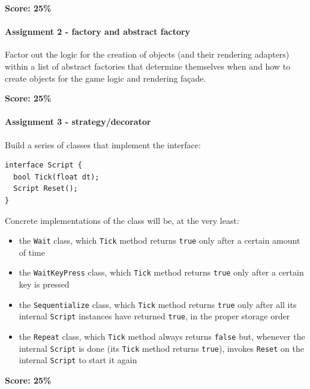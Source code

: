 \documentclass[titlepage,a4paper, 11pt]{article}
\begin{document}
\textbf{Score: 25\%}


\paragraph*{Assignment 2 - factory and abstract factory}
Factor out the logic for the creation of objects (and their rendering adapters) within a list of abstract factories that determine themselves when and how to create objects for the game logic and rendering façade.

\textbf{Score: 25\%}


\paragraph*{Assignment 3 - strategy/decorator}
Build a series of classes that implement the interface:

\begin{lstlisting}
interface Script {
  bool Tick(float dt);
  Script Reset();
}
\end{lstlisting}

Concrete implementations of the class will be, at the very least:
\begin{itemize}
\item the \texttt{Wait} class, which \texttt{Tick} method returns \texttt{true} only after a certain amount of time
\item the \texttt{WaitKeyPress} class, which \texttt{Tick} method returns \texttt{true} only after a certain key is pressed
\item the \texttt{Sequentialize} class, which \texttt{Tick} method returns \texttt{true} only after all its internal \texttt{Script} instances have returned \texttt{true}, in the proper storage order
\item the \texttt{Repeat} class, which \texttt{Tick} method always returns \texttt{false} but, whenever the internal \texttt{Script} is done (its \texttt{Tick} method returns \texttt{true}), invokes \texttt{Reset} on the internal \texttt{Script} to start it again
\end{itemize}

\textbf{Score: 25\%}

\newpage
\end{document}
